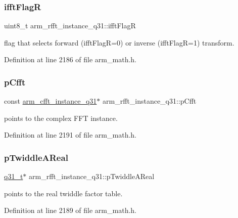 \subsubsection{\texorpdfstring{ifft\+FlagR}{ifftFlagR}}
{\footnotesize\ttfamily uint8\+\_\+t arm\+\_\+rfft\+\_\+instance\+\_\+q31\+::ifft\+FlagR}

flag that selects forward (ifft\+FlagR=0) or inverse (ifft\+FlagR=1) transform. 

Definition at line 2186 of file arm\+\_\+math.\+h.

\mbox{\label{structarm__rfft__instance__q31_a8fe10d425b59e096c23aa4bb5caa1974}} 
\subsubsection{\texorpdfstring{p\+Cfft}{pCfft}}
{\footnotesize\ttfamily const \hyperlink{structarm__cfft__instance__q31}{arm\+\_\+cfft\+\_\+instance\+\_\+q31}$\ast$ arm\+\_\+rfft\+\_\+instance\+\_\+q31\+::p\+Cfft}

points to the complex F\+FT instance. 

Definition at line 2191 of file arm\+\_\+math.\+h.

\mbox{\label{structarm__rfft__instance__q31_a2a0c944e66bab92fcbe19d1c29153250}} 
\subsubsection{\texorpdfstring{p\+Twiddle\+A\+Real}{pTwiddleAReal}}
{\footnotesize\ttfamily \hyperlink{arm__math_8h_adc89a3547f5324b7b3b95adec3806bc0}{q31\+\_\+t}$\ast$ arm\+\_\+rfft\+\_\+instance\+\_\+q31\+::p\+Twiddle\+A\+Real}

points to the real twiddle factor table. 

Definition at line 2189 of file arm\+\_\+math.\+h.

\mbox{\label{structarm__rfft__instance__q31_ae5070be4c2e0327e618f5e1f4c5b9d80}} 
